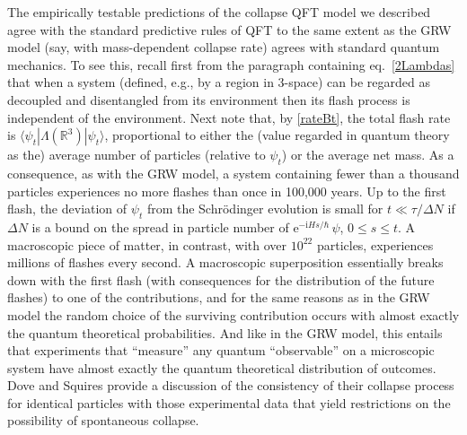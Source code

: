 \documentclass[12pt]{article}
\newcommand{\RRR}{\mathbb{R}}
\renewcommand{\sp}[2]{\langle #1 | #2 \rangle}
\newcommand{\E}{\mathrm{e}} %
\newcommand{\I}{\mathrm{i}} %
\newcommand{\1}{1}
\newcommand{\z}[1]{{#1}}
\begin{document}
The empirically testable predictions of the collapse QFT model we described agree with the standard predictive rules of QFT to the same extent as the GRW model \z{(say, with mass-dependent collapse rate)} agrees with standard quantum mechanics. To see this, recall first from the paragraph containing eq.~\eqref{2Lambdas} that when a system (defined, e.g., by a region in 3-space) can be regarded as decoupled and disentangled from its environment then its flash process is independent of the environment. Next note that, \z{by \eqref{rateBt}}, the total flash rate is $\sp{\psi_t}{\Lambda(\RRR^3)|\psi_t}$, proportional to \z{either} the (value regarded in quantum theory as the) average number of particles (relative to $\psi_t$) \z{or the average net mass}. As a consequence, as with the GRW model, a system containing fewer than a thousand particles experiences no more flashes than once in 100,000 years. Up to the first flash, the deviation of $\psi_t$ from the Schr\"odinger evolution is small for $t \ll \tau/\Delta N$ if $\Delta N$ is a bound on the spread in particle number of $\E^{-\I Hs/\hbar} \,\psi$, $0\leq s \leq t$. A macroscopic piece of matter, in contrast, with over $10^{22}$ particles, experiences millions of flashes every second. A macroscopic superposition essentially breaks down with the first flash (with consequences for the distribution of the future flashes) to one of the contributions, and for the same reasons as in the GRW model the random choice of the surviving contribution occurs with almost exactly the quantum theoretical probabilities. And like in the GRW model, this entails that experiments that ``measure'' any quantum ``observable'' on a microscopic system have almost exactly the quantum theoretical distribution of outcomes. \z{Dove and Squires \cite{DS95} provide a discussion of the consistency of their collapse process for identical particles with those experimental data that yield restrictions on the possibility of spontaneous collapse.}
\end{document}
